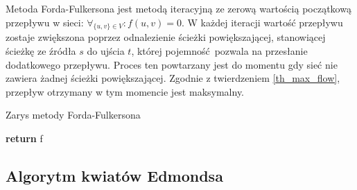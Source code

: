 \par{
  Metoda Forda-Fulkersona jest metodą iteracyjną ze zerową wartością początkową przepływu w sieci: $\forall_{\{u,v\}\in V}: f(u,v)=0$.
  W każdej iteracji wartość przepływu zostaje zwiększona poprzez odnalezienie ścieżki powiększającej, stanowiącej ścieżkę ze źródła $s$ do ujścia $t$, której pojemność pozwala na przesłanie dodatkowego przepływu.
  Proces ten powtarzany jest do momentu gdy sieć nie zawiera żadnej ścieżki powiększającej.
  Zgodnie z twierdzeniem \ref{th_max_flow}, przepływ otrzymany w tym momencie jest maksymalny.
  \begin{algorithm}
    \caption{Zarys metody Forda-Fulkersona}\label{alg_fordFulkerson}
    \begin{algorithmic}[1]




        \EndWhile
        \State\textbf{return} f
      \EndFunction
  \end{algorithmic}
  \end{algorithm}
}
\subsection{Algorytm kwiatów Edmondsa}\label{ss_edmonds}




